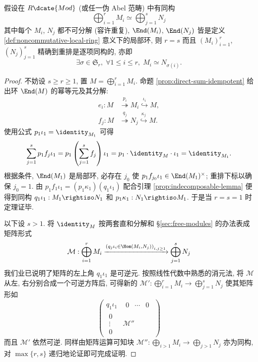 \begin{theorem}\label{prop:KRS-uniqueness}
	假设在 $R\dcate{Mod}$ (或任一伪 Abel 范畴) 中有同构
	\[ \bigoplus_{i=1}^r M_i \simeq \bigoplus_{j=1}^s N_j \]
	其中每个 $M_i$, $N_j$ 都不可分解 (容许重复), $\End(M_i)$, $\End(N_j)$ 皆是定义 \ref{def:noncommutative-local-ring} 意义下的局部环, 则 $r=s$ 而且 $(M_i)_{i=1}^r$, $(N_j)_{j=1}^s$ 精确到重排是逐项同构的, 亦即
	\[\exists \sigma \in \mathfrak{S}_r, \; \forall 1 \leq i \leq r, \; M_i \simeq N_{\sigma(i)}. \]
\end{theorem}
\begin{proof}
	不妨设 $s \geq r \geq 1$, 置 $M = \bigoplus_{i=1}^r M_i$. 命题 \ref{prop:direct-sum-idempotent} 给出环 $\End(M)$ 的幂等元及其分解:
	\begin{align*}
		e_i: M & \stackrel{p_i}{\twoheadrightarrow} M_i \stackrel{\iota_i}{\hookrightarrow} M, \\
		f_j: M & \stackrel{q_j}{\twoheadrightarrow} N_j \stackrel{\kappa_j}{\hookrightarrow} M.
	\end{align*}
	使用公式 $p_1 \iota_1 = \identity_{M_1}$ 可得
	\[ \sum_{j=1}^s p_1 f_j \iota_1 = p_1 \left( \sum_{j=1}^s f_j \right) \iota_1 = p_1 \cdot \identity_M \cdot \iota_1 = \identity_{M_1}. \]
	根据条件, $\End(M_1)$ 是局部环, 必存在 $j_0$ 使 $p_1 f_{j_0} \iota_1 \in \End(M_1)^\times$; 重排下标以确保 $j_0=1$. 由 $p_1 f_1 \iota_1 = (p_1 \kappa_1) (q_1 \iota_1)$ 配合引理 \ref{prop:indecomposable-lemma} 便得到同构 $q_1 \iota_1: M_1 \rightiso N_1$ 和 $p_1 \kappa_1: N_1 \rightiso M_1$. 于是当 $r=s=1$ 时定理证毕.
	
	以下设 $s > 1$. 将 $\identity_M$ 按两套直和分解和 \S\ref{sec:free-modules} 的办法表成矩阵形式
	\[ \mathcal{M}: \bigoplus_{i=1}^r M_i \xrightarrow{\left( q_j \iota_i \in \Hom(M_i, N_j) \right)_{i,j \geq 1}} \bigoplus_{j=1}^s N_j \]
	我们业已说明了矩阵的左上角 $q_1 \iota_1$ 是可逆元. 按照线性代数中熟悉的消元法, 将 $\mathcal{M}$ 从左, 右分别合成一个可逆方阵后, 可得新的 $\mathcal{M}': \bigoplus_{i=1}^r M_i \to \bigoplus_{j=1}^s N_j$ 使其矩阵形如
	\[ \begin{pmatrix}
		q_1 \iota_1 & \begin{array}{ccc} 0 & \cdots & 0 \end{array} \\
		\begin{array}{c} 0 \\ \vdots \\ 0 \end{array} & \mathcal{M}''
	\end{pmatrix} \]
	而且 $\mathcal{M'}$ 依然可逆. 同样由矩阵运算可知块 $\mathcal{M}'': \bigoplus_{i>1} M_i \to \bigoplus_{j>1} N_j$ 亦为同构, 对 $\max\{r,s\}$ 递归地论证即可完成证明.
\end{proof}

